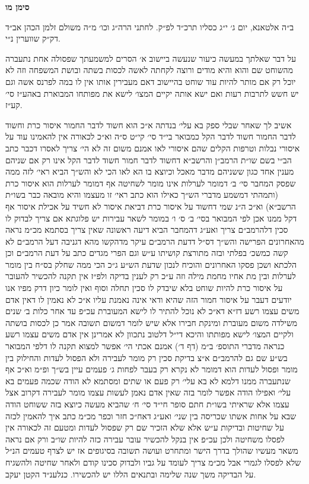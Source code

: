 \documentclass[12pt, openany]{book}
\newcommand{\chapname}{}
\newcommand{\newchap}[1]{
	\addcontentsline{toc}{chapter}{#1}
	\renewcommand{\chapname}{#1}
		\begin{center}
			\textbf{%
\fontsize{16pt}{16pt}\selectfont
				#1}
		\end{center}
}
\begin{document}
\newchap{סימן מו}
\begin{multicols}{2}
ב״ה אלטאנא, יום ג׳ י״ג כסליו תרכ״ד לפ״ק. לחתני הרה״ג וכו׳ מ״ה משולם זלמן הכהן אב״ד דק״ק שווערין נ״י.\\\vspace{0pt}

על דבר שאלתך במעשה כיעור שנעשה ביישוב א׳ הסרים למשמעתך שפסולה אחת נתעברה מהשוחט שם והוא והיא מודים ורוצה לקחתה לאשה לכסות בשתה ובושת המשפחה וזה לא יוכל רק אם מותר להיות עוד שוחט בהיישוב דאם מעבירין אותו אין לו במה לפרנס אשה וגם יש חשש לתרבות רעות ואם ישא אותה יקיים המצו׳ לישא את מפותחו המבוארת באהע״ז סי׳ קע״ז.\\\vspace{0pt}

אשיב לך שאחר שבלי ספק בא עלי׳ בנדתה א״כ הוא חשוד לדבר החמור איסור כרת וחשוד לדבר החמור חשוד לדבר הקל כמבואר בי״ד סי׳ קי״ט ס״ה וא״כ לכאורה אין להאמינו עוד על איסורי נבלות וטרפות הקלים שהם איסורי לאו אמנם משום זה לא הי׳ צריך לאסרו דכבר כתב הב״י בשם שו״ת הרמב״ן והרשב״א דחשוד לדבר חמור חשוד לדבר הקל אינו רק אם שניהם מענין אחד כגון ששניהם מדבר מאכל וכיוצא בו הא לאו הכי לא והש״ך הביא ראי׳ לזה ממה שפסק המחבר סי׳ ב׳ דמומר לערלות אינו מומר לשחיטה אף דמומר לערלות הוא איסור כרת (ותמהתי דמשמע מדברי הש״ך כאילו הוא כתב ראי׳ זו מעצמו והיא מובאה כבר בשו״ת הרשב״א) וא״כ ה״נ שמי דחשוד על איסור כרת דביאת איסור לא חשיד על אכילת איסור אף דקל ממנו אכן לפי המבואר בסי׳ ב׳ ס׳ ו׳ במומר לשאר עבירות יש פלוגתא אם צריך לבדוק לו סכין דלהרמב״ם צריך ואע״ג דהמחבר הביא דיעה ראשונה שאין צריך בסתמא מכ״מ נראה מהאחרונים הפרישה והש״ך דס״ל דדעת הרמב״ם עיקר מדהקשו מהא דגניבה דעל הרמב״ם לא קשה כמשכ׳ בפלתי ובזה מתורצת קושיתו ע״ש וגם הפרי מגדים כתב על דעת הרמב״ם וכן הלכתא ושכן פסקו האחרונים והוכיח לנכון שדעת הש״ע ג״כ הכי ממה שחלק בס״ח בין מומר לערלות ובין מת אחיו מחמת מילה וזה ע״כ רק לענין בדיקה ולפ״ז אין תקנה להכשיר להעובר על איסור כרת להיות שוחט בלא שיבדק לו סכין תחלה וסוף ואין לומר כיון דרק מפיו אנו יודעים דעבר על איסור חמור הזה שהיא ודאי אינה נאמנת עליו א״כ לא נאמין לו דאין אדם משים עצמו רשע דז״א דא״כ לא נוכל להתיר לו לישא המעוברת עכ״פ עד אחר כלות ב׳ שנים משילדה משום מעוברת ומינקת חבירו אלא שיש לומר דמשום תשובה אמר כן לכסות בושתה ולקיים המצו׳ לישא מפותתו והיכא די״ל דלטוב נתכוון לא אמרינן אין אדם משים עצמו רשע כנראה מדברי התוספ׳ ב״מ (דף ד׳) אמנם אכתי הי׳ אפשר למצוא תקנה לו דלפי המבואר בש״ע שם גם להרמב״ם א״צ בדיקת סכין רק מומר לעבירה ולא הפסול לעדות והחילוק בין מומר ופסול לעדות הוא דמומר לא נקרא רק בעבר לפחות ג׳ פעמים עיין בש״ך ופ״מ וא״כ אף שנתעברה ממנו דלמא לא בא עלי׳ רק פעם או שתים ומסתמא לא הודה שכמה פעמים בא עלי׳ ואפילו הודה אפשר לומר בזה שאין אדם נאמן לעשות עצמו מומר לעבירה דקרוב אצל עצמו אלא שראיתי בשו״ת חתם סופר חי״ד סי׳ ח׳ שהביא מעשה כיוצא בזה ששוחט הודה שבא על אחות אשתו שכריסה בין שני׳ ואע״ג דאח״כ חזר וכפר מכ״מ כתב איך להאמין לכזה על שחיטות ובדיקות ע״ש אלא שלא הזכיר שם רק שפסול לעדות ומטעם זה לכאורה אין לפסלו משחיטה ולכן עכ״פ אין בנקל להכשיר עובר עבירה כזה להיות שו״ב ורק אם נראה משאר מעשיו שהולך בדרך הישר ומתחרט ועושה תשובה בסיגופים אז יש לצרף טעמים הנ״ל שלא לפסלו לגמרי אבל מכ״מ צריך לעומד על גביו ולבדוק סכינו קודם ולאחר שחיטה ולהשגיח על הבדיקה משך שנה שלימה ובתנאים הללו יש להכשירו. כנלענ״ד הקטן יעקב.\\\vspace{0pt}


\end{multicols}
\end{document}
